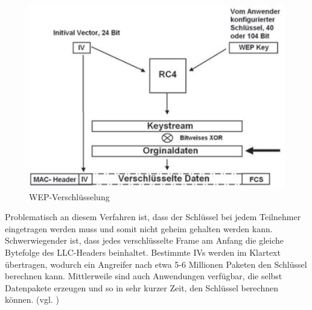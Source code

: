 \begin{figure} [htb]
\begin{centering}
\includegraphics{Bilder/Kapitel2/wep_funktionsweise.jpg}
\caption[WEP-Verschlüsselung]{WEP-Verschlüsselung \cite{SWB-430171331}}
\label{wep_funktionsweise}
\end{centering}
\end{figure}

Problematisch an diesem Verfahren ist, dass der Schlüssel bei jedem Teilnehmer eingetragen werden muss und somit nicht geheim gehalten werden kann. Schwerwiegender ist, dass jedes verschlüsselte Frame am Anfang die gleiche Bytefolge des \ac{LLC}-Headers beinhaltet. Bestimmte \acp{IV} werden im Klartext übertragen, wodurch ein Angreifer nach etwa 5-6 Millionen Paketen den Schlüssel berechnen kann. Mittlerweile sind auch Anwendungen verfügbar, die selbst Datenpakete erzeugen und so in sehr kurzer Zeit, den Schlüssel berechnen können. (vgl. \cite{SWB-430171331})

